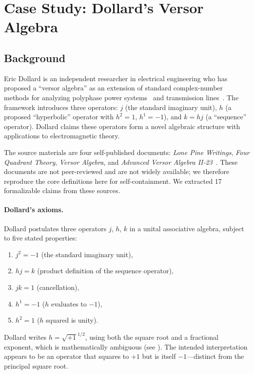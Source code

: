 \documentclass[runningheads]{llncs}
\begin{document}
\section{Case Study: Dollard's Versor Algebra}
\label{sec:case-study}

\subsection{Background}

Eric Dollard is an independent researcher in electrical engineering who has
proposed a ``versor algebra'' as an extension of standard complex-number methods
for analyzing polyphase power systems~\cite{fortescue1918} and transmission
lines~\cite{dollard-versor,dollard-fourquad}. The framework introduces three
operators: $j$ (the standard imaginary unit), $h$ (a proposed ``hyperbolic''
operator with $h^2 = 1$, $h^1 = -1$), and $k = hj$ (a ``sequence'' operator).
Dollard claims these operators form a novel algebraic structure with applications
to electromagnetic theory.

The source materials are four self-published documents: \emph{Lone Pine
Writings}, \emph{Four Quadrant Theory}, \emph{Versor Algebra}, and
\emph{Advanced Versor Algebra II-23}~\cite{dollard-versor,dollard-fourquad}.
These documents are not peer-reviewed and are not widely available; we
therefore reproduce the core definitions here for self-containment.
We extracted 17 formalizable claims from these sources.

\paragraph{Dollard's axioms.}
Dollard postulates three operators $j$, $h$, $k$ in a unital associative
algebra, subject to five stated properties:
\begin{enumerate}[label=(A\arabic*),nosep]
  \item $j^2 = -1$ \quad (the standard imaginary unit),
  \item $hj = k$ \quad (product definition of the sequence operator),
  \item $jk = 1$ \quad (cancellation),
  \item $h^1 = -1$ \quad ($h$ evaluates to $-1$),
  \item $h^2 = 1$ \quad ($h$ squared is unity).
\end{enumerate}
Dollard writes $h = \sqrt{+1}^{1/2}$, using both the square root and a
fractional exponent, which is mathematically ambiguous
(see ).  The intended interpretation appears to be an
operator that squares to $+1$ but is itself $-1$---distinct from the
principal square root.
\end{document}
